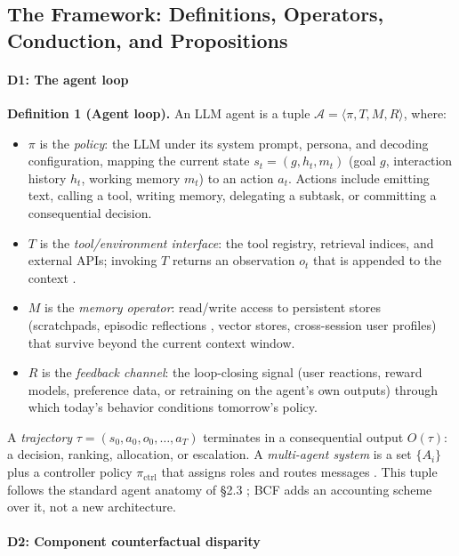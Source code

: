 \documentclass[acmsmall,nonacm]{acmart}
\begin{document}
\subsection{The Framework: Definitions, Operators, Conduction, and Propositions}

\paragraph{D1: The agent loop}

\textbf{Definition 1 (Agent loop).} An LLM agent is a tuple $\mathcal{A} = \langle \pi, T, M, R \rangle$, where:

\begin{itemize}
\item $\pi$ is the \emph{policy}: the LLM under its system prompt, persona, and decoding configuration, mapping the current state $s_t = (g, h_t, m_t)$ (goal $g$, interaction history $h_t$, working memory $m_t$) to an action $a_t$. Actions include emitting text, calling a tool, writing memory, delegating a subtask, or committing a consequential decision.
\item $T$ is the \emph{tool/environment interface}: the tool registry, retrieval indices, and external APIs; invoking $T$ returns an observation $o_t$ that is appended to the context \cite{schick2023toolformer,yao2023react,qu2024tool}.
\item $M$ is the \emph{memory operator}: read/write access to persistent stores (scratchpads, episodic reflections \cite{shinn2023reflexion}, vector stores, cross-session user profiles) that survive beyond the current context window.
\item $R$ is the \emph{feedback channel}: the loop-closing signal (user reactions, reward models, preference data, or retraining on the agent's own outputs) through which today's behavior conditions tomorrow's policy.
\end{itemize}

A \emph{trajectory} $\tau = (s_0, a_0, o_0, \ldots, a_T)$ terminates in a consequential output $O(\tau)$: a decision, ranking, allocation, or escalation. A \emph{multi-agent system} is a set $\{A_i\}$ plus a controller policy $\pi_{\mathrm{ctrl}}$ that assigns roles and routes messages \cite{wu2023autogen,guo2024large}. This tuple follows the standard agent anatomy of \S{}2.3 \cite{wang2024survey,xi2023rise,sumers2024cognitive}; BCF adds an accounting scheme over it, not a new architecture.

\paragraph{D2: Component counterfactual disparity}
\end{document}
